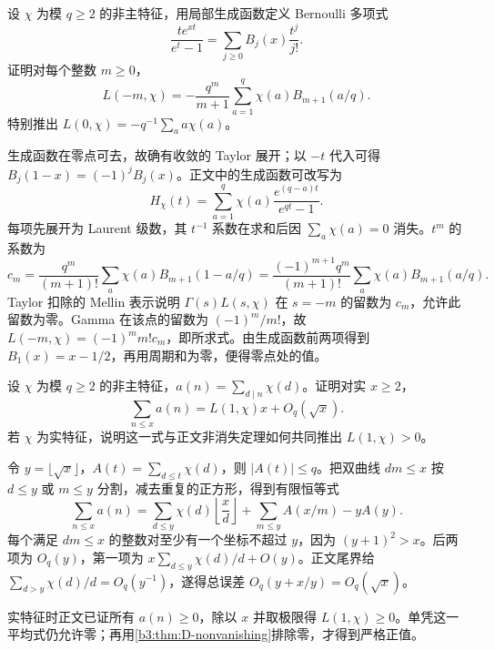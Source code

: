 \begin{exercise}\label{b3:ex:D-6}
设 \(\chi\) 为模 \(q\ge2\) 的非主特征，用局部生成函数定义 Bernoulli 多项式
\[
 \frac{t e^{xt}}{e^t-1}=\sum_{j\ge0}B_j(x)\frac{t^j}{j!}.
\]
证明对每个整数 \(m\ge0\)，
\[
 L(-m,\chi)=-\frac{q^m}{m+1}\sum_{a=1}^q\chi(a)B_{m+1}(a/q).
\]
特别推出 \(L(0,\chi)=-q^{-1}\sum_a a\chi(a)\)。
\end{exercise}
\begin{solution}
生成函数在零点可去，故确有收敛的 Taylor 展开；以 \(-t\) 代入可得 \(B_j(1-x)=(-1)^jB_j(x)\)。正文中的生成函数可改写为
\[
 H_\chi(t)=\sum_{a=1}^q\chi(a)\frac{e^{(q-a)t}}{e^{qt}-1}.
\]
每项先展开为 Laurent 级数，其 \(t^{-1}\) 系数在求和后因 \(\sum_a\chi(a)=0\) 消失。\(t^m\) 的系数为
\[
 c_m=\frac{q^m}{(m+1)!}\sum_a\chi(a)B_{m+1}(1-a/q)
 =\frac{(-1)^{m+1}q^m}{(m+1)!}\sum_a\chi(a)B_{m+1}(a/q).
\]
Taylor 扣除的 Mellin 表示说明 \(\Gamma(s)L(s,\chi)\) 在 \(s=-m\) 的留数为 \(c_m\)，允许此留数为零。Gamma 在该点的留数为 \((-1)^m/m!\)，故 \(L(-m,\chi)=(-1)^mm!c_m\)，即所求式。由生成函数前两项得到 \(B_1(x)=x-1/2\)，再用周期和为零，便得零点处的值。
\end{solution}

\begin{exercise}\label{b3:ex:D-7}
设 \(\chi\) 为模 \(q\ge2\) 的非主特征，\(a(n)=\sum_{d\mid n}\chi(d)\)。证明对实 \(x\ge2\)，
\[
 \sum_{n\le x}a(n)=L(1,\chi)x+O_q(\sqrt x).
\]
若 \(\chi\) 为实特征，说明这一式与正文非消失定理如何共同推出 \(L(1,\chi)>0\)。
\end{exercise}
\begin{solution}
令 \(y=\lfloor\sqrt x\rfloor\)，\(A(t)=\sum_{d\le t}\chi(d)\)，则 \(|A(t)|\le q\)。把双曲线 \(dm\le x\) 按 \(d\le y\) 或 \(m\le y\) 分割，减去重复的正方形，得到有限恒等式
\[
 \sum_{n\le x}a(n)=\sum_{d\le y}\chi(d)\left\lfloor\frac xd\right\rfloor
                   +\sum_{m\le y}A(x/m)-yA(y).
\]
每个满足 \(dm\le x\) 的整数对至少有一个坐标不超过 \(y\)，因为 \((y+1)^2>x\)。后两项为 \(O_q(y)\)，第一项为 \(x\sum_{d\le y}\chi(d)/d+O(y)\)。正文尾界给
\(\sum_{d>y}\chi(d)/d=O_q(y^{-1})\)，遂得总误差 \(O_q(y+x/y)=O_q(\sqrt x)\)。

实特征时正文已证所有 \(a(n)\ge0\)，除以 \(x\) 并取极限得 \(L(1,\chi)\ge0\)。单凭这一平均式仍允许零；再用\cref{b3:thm:D-nonvanishing}排除零，才得到严格正值。
\end{solution}

